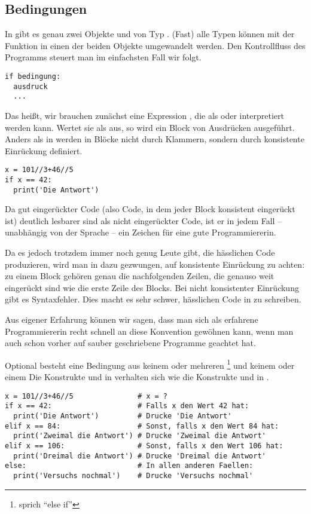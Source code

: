\subsection{Bedingungen}
\label{section:crashkurs:bedingungen}
In \Python gibt es genau zwei Objekte  und  von Typ .
(Fast) alle Typen können mit der Funktion  in einen der beiden Objekte umgewandelt werden.
Den Kontrollfluss des Programms steuert man im einfachsten Fall wir folgt.
\begin{lstlisting}
if bedingung:
  ausdruck
  ...
\end{lstlisting}
Das heißt, wir brauchen zunächst eine Expression , die als  oder  interpretiert werden kann.
Wertet sie als  aus, so wird ein Block von Ausdrücken ausgeführt.
Anders als in \CC werden in \Python Blöcke nicht durch Klammern, sondern durch konsistente Einrückung definiert.
\begin{lstlisting}
x = 101//3+46//5
if x == 42:
  print('Die Antwort')
\end{lstlisting}
Da gut eingerückter Code (also Code, in dem jeder Block konsistent eingerückt ist) deutlich lesbarer sind als nicht eingerückter
Code, ist er in jedem Fall -- unabhängig von der Sprache -- ein Zeichen für eine gute Programmiererin. 

Da es jedoch trotzdem immer noch genug Leute gibt, die hässlichen Code produzieren, wird man in \Python dazu gezwungen, auf 
konsistente Einrückung zu achten: zu einem Block gehören genau die nachfolgenden Zeilen, die genauso weit eingerückt sind wie die 
erste Zeile des Blocks. Bei nicht konsistenter Einrückung gibt es Syntaxfehler. Dies macht es sehr schwer, hässlichen Code in
\Python zu schreiben.

Aus eigener Erfahrung können wir sagen, dass man sich als erfahrene \CC Programmiererin recht schnell an diese Konvention gewöhnen kann, 
wenn man auch schon vorher auf sauber geschriebene Programme geachtet hat.

Optional besteht eine Bedingung aus keinem oder mehreren \footnote{sprich ``else if''} und keinem oder einem 
Die Konstrukte  und  in \Python verhalten sich wie die Konstrukte  und  in \CC.
\begin{lstlisting}
x = 101//3+46//5               # x = ?
if x == 42:                    # Falls x den Wert 42 hat:
  print('Die Antwort')         # Drucke 'Die Antwort'
elif x == 84:                  # Sonst, falls x den Wert 84 hat:
  print('Zweimal die Antwort') # Drucke 'Zweimal die Antwort'
elif x == 106:                 # Sonst, falls x den Wert 106 hat:
  print('Dreimal die Antwort') # Drucke 'Dreimal die Antwort'
else:                          # In allen anderen Faellen:
  print('Versuchs nochmal')    # Drucke 'Versuchs nochmal'
\end{lstlisting}


